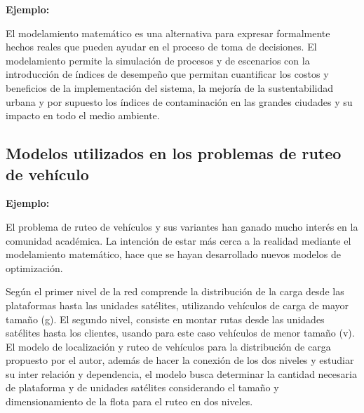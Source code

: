{\bf Ejemplo:}\par

El modelamiento matemático es una alternativa para expresar formalmente hechos reales que pueden ayudar en el proceso de toma de decisiones. El modelamiento permite la simulación de procesos  y de escenarios con la introducción de índices de desempeño que permitan cuantificar los costos y beneficios de la implementación del sistema, la mejoría de la sustentabilidad urbana y por supuesto los índices de contaminación en las grandes ciudades y su impacto en todo el medio ambiente. 

\subsection{Modelos utilizados en los problemas de ruteo de vehículo }

{\bf Ejemplo:}\par

El problema de ruteo de vehículos \citep{Ombuki, Yeun} y sus variantes han ganado mucho interés en la comunidad académica. La intención de estar más cerca a la realidad mediante el modelamiento matemático, hace que se hayan desarrollado nuevos modelos de optimización. \par
\vskip 0.3cm
Según \cite{Sterle} el primer nivel de la red comprende la distribución de la carga desde las plataformas hasta las unidades satélites, utilizando vehículos de carga de mayor tamaño (g).  El segundo nivel, consiste en montar rutas desde las unidades satélites hasta los clientes, usando para este caso vehículos de menor tamaño (v). El modelo de localización y ruteo de vehículos para la distribución de carga propuesto por el autor, además de hacer la conexión de los dos niveles y estudiar su inter relación y dependencia, el modelo busca determinar la cantidad necesaria de plataforma y de unidades satélites considerando el tamaño y dimensionamiento de la flota para el ruteo en dos niveles. 
\vskip 0.2cm


